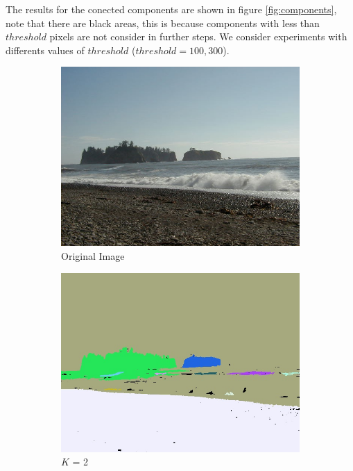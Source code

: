 The results for the conected components are shown in figure \ref{fig:components}, note that there are black areas, this is because components with less than $threshold$ pixels are not consider in further steps. We consider experiments with differents values of $threshold$ ($threshold = 100, 300 $).

\begin{figure}[H]
	\centering
	\begin{subfigure}{0.5\textwidth}
	  \centering
	  \includegraphics[width=0.9\linewidth]{figs/beach_1.jpg}
	  \caption{Original Image}
	\end{subfigure}%
	\begin{subfigure}{0.5\textwidth}
	  \centering
	  \includegraphics[width=0.9\linewidth]{figs/beach_1_compK2.jpg}
	  \caption{$K$ = 2}
	\end{subfigure}
	\begin{subfigure}{0.5\textwidth}

\end{subfigure}
\end{figure}

